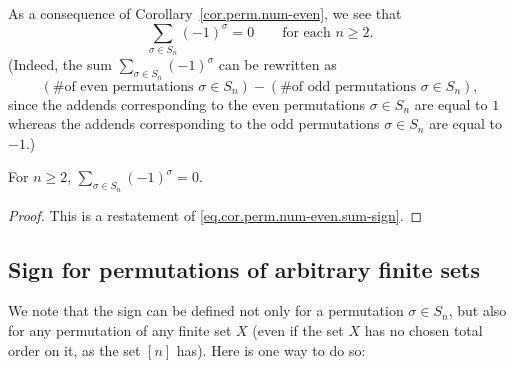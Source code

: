As a consequence of Corollary~\ref{cor.perm.num-even}, we see that
\begin{equation}
\label{eq.cor.perm.num-even.sum-sign}
\sum_{\sigma \in S_n} (-1)^{\sigma} = 0
\qquad \text{for each } n \geq 2.
\end{equation}
(Indeed, the sum $\sum_{\sigma \in S_n} (-1)^{\sigma}$ can be
rewritten as
\[
\left(\text{\# of even permutations } \sigma \in S_n \right)
- \left(\text{\# of odd permutations } \sigma \in S_n \right),
\]
since the addends corresponding to the even permutations $\sigma \in S_n$ are
equal to $1$ whereas the addends corresponding to the odd permutations
$\sigma \in S_n$ are equal to $-1$.)

\begin{lemma}
\label{lem.perm.sum-sign-eq-zero}
\leanhelper
\leanok
For $n \geq 2$,
$\displaystyle\sum_{\sigma \in S_n} (-1)^{\sigma} = 0$.
\end{lemma}

\begin{proof}
\leanok
This is a restatement of \eqref{eq.cor.perm.num-even.sum-sign}.
\end{proof}

\subsection{Sign for permutations of arbitrary finite sets}

We note that the sign can be defined not only for a permutation
$\sigma \in S_n$, but also for any permutation of any finite set $X$
(even if the set $X$ has no chosen total order on it, as the set $[n]$ has).
Here is one way to do so:


